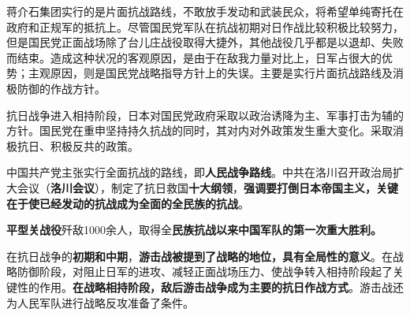 蒋介石集团实行的是片面抗战路线，不敢放手发动和武装民众，将希望单纯寄托在政府和正规军的抵抗上。尽管国民党军队在抗战初期对日作战比较积极比较努力，但是国民党正面战场除了台儿庄战役取得大捷外，其他战役几乎都是以退却、失败而结束。造成这种状况的客观原因，是由于在敌我力量对比上，日军占很大的优势；主观原因，则是国民党战略指导方针上的失误。主要是实行片面抗战路线及消极防御的作战方针。

{抗日战争进入相持阶段，}日本对国民党政府采取以政治诱降为主、军事打击为辅的方针{。国民党在重申坚持持久抗战的同时，其对内对外政策发生重大变化。}采取消极抗日、积极反共的政策{。}

中国共产党主张实行全面抗战的路线，即\textbf{人民战争路线}。中共在洛川召开政治局扩大会议（\textbf{洛川会议}），制定了抗日救国\textbf{十大纲领}，\textbf{强调要打倒日本帝国主义，关键在于使已经发动的抗战成为全面的全民族的抗战}。

\textbf{平型关战役}歼敌{1000}余人，取得全\textbf{民族抗战以来中国军队的第一次重大胜利。}

{在抗日战争的}\textbf{初期和中期}{，}\textbf{游击战被提到了战略的地位，具有全局性的意义}{。在战略防御阶段，对阻止日军的进攻、减轻正面战场压力、使战争转入相持阶段起了关键性的作用。}\textbf{在战略相持阶段，敌后游击战争成为主要的抗日作战方式}{。游击战还为人民军队进行战略反攻准备了条件。}
